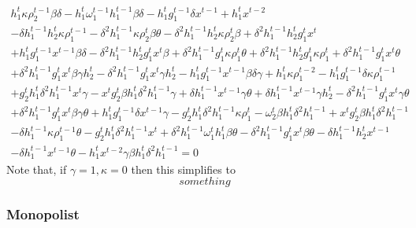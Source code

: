 \documentclass{amsart}
\begin{document}
\begin{multline}
  \label{eq:32}
  h_1^t \kappa \rho_2^{t-1} \beta \delta- h_1^t \omega_1^{t-1}
  h_1^{t-1} \beta \delta- h_1^t g_1^{t-1} \delta x^{t-1}+ h_1^t
  x^{t-2}\\-\delta h_1^{t-1} h_2^t \kappa \rho_1^{t-1}- \delta ^2
  h_1^{t-1} \kappa \rho_2^t \beta \theta-{ \delta}^2 h_1^{t-1} h_2^t
  \kappa \rho_2^t \beta+ \delta ^{ 2} h_1^{t-1} h_2^t g_1^t x^t\\ +
  h_1^t g_1^{t-1} x^{t-1} \beta \delta- \delta ^2 h_1^{t-1} h_2^t
  g_1^t x^t \beta+ \delta ^2 h_1^{t-1} g_1^t \kappa \rho_1^t \theta+
  \delta ^2 h_1^{t-1} h_2^t g_1^t \kappa \rho_1^t + \delta ^2
  h_1^{t-1} g_1^t x^t \theta\\+ \delta ^2 h_1^{t-1} g_1^t x^t \beta
  \gamma h_2^t- \delta ^2 h_1^{t-1} g_1^t x^t \gamma h_2^t- h_1^t
  g_1^{t-1} x^{t-1} \beta \delta \gamma+ h_1^t \kappa \rho_1^{t-2}-
  h_1^t g_1^{t-1} \delta \kappa \rho_1^{t-1}\\+ g_2^t h_1^t {
    \delta}^2 h_1^{t-1} x^t \gamma- x^t g_2^t \beta h_1^t \delta ^2
  h_1^{t-1} \gamma+\delta h_1^{t-1} x^{t-1} \gamma \theta+\delta
  h_1^{t-1} x^{t-1} \gamma h_2^t- \delta ^2 h_1^{t-1} g_1^t x^t \gamma
  \theta\\+ \delta ^2 h_1^{t-1} g_1^t x^t \beta \gamma \theta+ h_1^t
  g_1^{t-1} \delta x^{t-1} \gamma- g_2^t h_1^t \delta ^2 h_1^{t-1}
  \kappa \rho_1^t- \omega_2^t \beta h_1^t \delta ^2 h_1^{t-1}+ x^t
  g_2^t \beta h_1^t \delta ^2 h_1^{t-1}\\- \delta h_1^{t-1} \kappa
  \rho_1^{t-1} \theta- g_2^t h_1^t { \delta}^2 h_1^{t-1} x^t + \delta
  ^2 h_1^{t-1} \omega_1^t h_1^t \beta \theta- \delta ^2 h_1^{t-1}
  g_1^t x^t \beta \theta-\delta h_1^{t-1} h_2^t x^{t-1}\\-\delta
  h_1^{t-1} x^{t-1} \theta- h_1^t x^{t-2} \gamma{\beta h_1^t {\delta
    }^2 h_1^{t-1}} = 0
\end{multline}
Note that, if $\gamma=1, \kappa=0$ then this simplifies to
\begin{equation}
\label{eq:48}
something
\end{equation}


\subsubsection{Monopolist}
\label{sec:monopolist-1}
\end{document}
